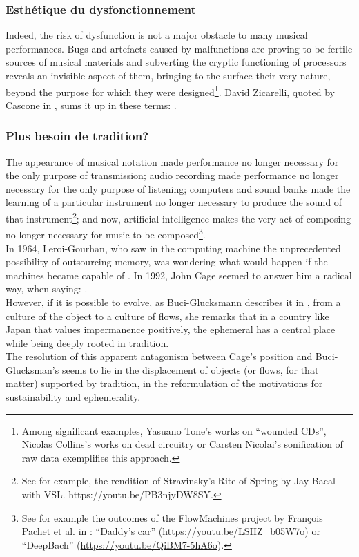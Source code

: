 \subsubsection{Esthétique du dysfonctionnement}

Indeed, the risk of dysfunction is not a major obstacle to many musical performances. Bugs and artefacts caused by malfunctions are proving to be fertile sources of musical materials and subverting the cryptic functioning of processors reveals an invisible aspect of them, bringing to the surface their very nature, beyond the purpose for which they were designed\footnote{Among significant examples, Yasuano Tone's works on “wounded CDs”, Nicolas Collins's works on dead circuitry or Carsten Nicolai's sonification of raw data exemplifies this approach.}. David Zicarelli, quoted by Cascone in \cite{cascone_aesthetics_2000}, sums it up in these terms: .

\subsubsection{Plus besoin de tradition?}

The appearance of musical notation made performance no longer necessary for the only purpose of transmission; audio recording made performance no longer necessary for the only purpose of listening; computers and sound banks made the learning of a particular instrument no longer necessary to produce the sound of that instrument\footnote{See for example, the rendition of Stravinsky's Rite of Spring by Jay Bacal with VSL. https://youtu.be/PB3njyDW8SY.}; and now, artificial intelligence makes the very act of composing no longer necessary for music to be composed\footnote{See for example the outcomes of the FlowMachines project by François Pachet et al. in \cite{hadjeres_deepbach:_2016}: “Daddy's car” (\url{https://youtu.be/LSHZ_b05W7o}) or “DeepBach” (\url{https://youtu.be/QiBM7-5hA6o}).}.\\
\indent In 1964, Leroi-Gourhan, who saw in the computing machine the unprecedented possibility of outsourcing memory, was wondering what would happen if the machines became capable of  \cite{leroi-gourhan_geste_1964}. In 1992, John Cage seemed to answer him a radical way, when saying:  \cite{sebestik_ecoute_1992}. \\
\indent However, if it is possible to evolve, as Buci-Glucksmann describes it in \cite{buci-glucksmann_esthetique_2003}, from a culture of the object to a culture of flows, she remarks that in a country like Japan that values impermanence positively, the ephemeral has a central place while being deeply rooted in tradition.	\\
\indent The resolution of this apparent antagonism between Cage's position and Buci-Glucksman's seems to lie in the displacement of objects (or flows, for that matter) supported by tradition, in the reformulation of the motivations for sustainability and ephemerality.


